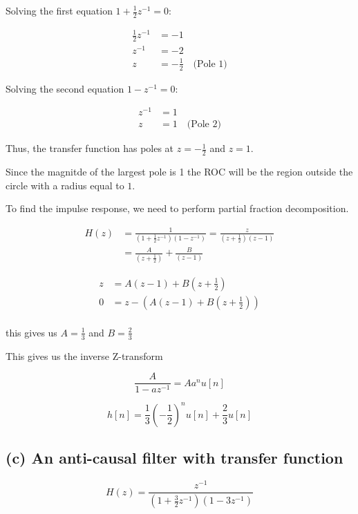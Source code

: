 Solving the first equation \(1 + \frac{1}{2} z^{-1} = 0\):

\begin{align*}
    \frac{1}{2} z^{-1} &= -1 \\
    z^{-1} &= -2 \\
    z &= -\frac{1}{2} \quad \text{(Pole 1)}
\end{align*}

Solving the second equation \(1 - z^{-1} = 0\):

\begin{align*}
    z^{-1} &= 1 \\
    z &= 1 \quad \text{(Pole 2)}
\end{align*}

Thus, the transfer function has poles at \( z = -\frac{1}{2} \) and \( z = 1 \).

Since the magnitde of the largest pole is 1 the ROC will be the region outside the circle with a radius equal to $1$.

To find the impulse response, we need to perform partial fraction decomposition.

\begin{align*}
    H(z)&=\frac{1}{\left(1+\frac{1}{2} z^{-1}\right)\left(1-z^{-1}\right)}=\frac{z}{\left(z+\frac{1}{2}\right)\left(z-1\right)}\\
    &=\frac{A}{\left(z+\frac{1}{2}\right)}+\frac{B}{\left(z-1\right)}
\end{align*}

\begin{align*}
    z&=A(z-1)+B(z+\frac{1}{2})\\
    0&=z-\left(A(z-1)+B\left(z+\frac{1}{2}\right)\right)\\
\end{align*}

this gives us $A=\frac{1}{3}$ and $B=\frac{2}{3}$

This gives us the inverse Z-transform

\begin{equation*}
    \frac{A}{1-az^{-1}}=A a^nu[n]
\end{equation*}

\begin{equation*}
    h[n]= \frac{1}{3} \left(-\frac{1}{2}\right)^n u[n]+\frac{2}{3}u[n]
\end{equation*}

\subsection*{(c) An anti-causal filter with transfer function}
\begin{equation*}
    H(z)=\frac{z^{-1}}{\left(1+\frac{3}{2} z^{-1}\right)\left(1-3 z^{-1}\right)} 
\end{equation*}

